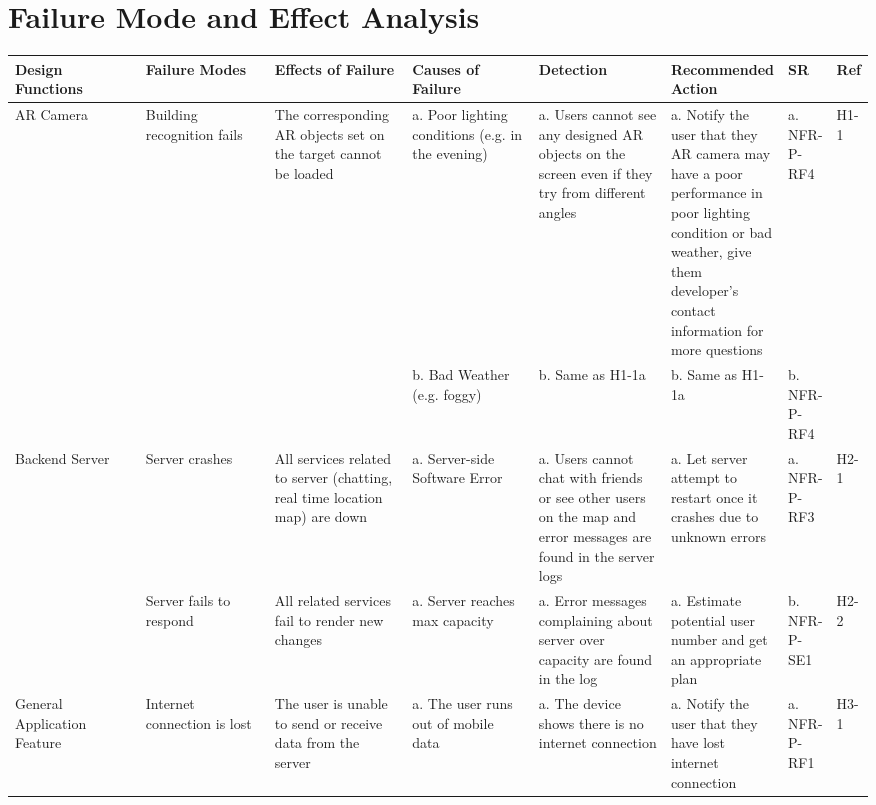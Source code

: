 \documentclass{article}
\begin{document}
\section{Failure Mode and Effect Analysis}
\begin{table}[H]
    \begin{adjustbox}{width=(/5)}
    \centering
    

    \begin{tabular}{|p{0.20\linewidth} | p{0.20\linewidth} | p{0.20\linewidth}|  p{0.20\linewidth}|  p{0.21\linewidth}|  p{0.30\linewidth}|  p{0.08\linewidth}|p{0.07\linewidth}| }
    \hline
         \textbf{Design Functions} & \textbf{Failure Modes} & \textbf{Effects of Failure} & \textbf{Causes of Failure} &\textbf{Detection}& \textbf{Recommended Action} & \textbf{SR} & \textbf{Ref}\\
         \hline
         AR Camera      &     Building recognition fails      &      The corresponding AR objects set on the target cannot be loaded      &      a. Poor lighting conditions (e.g. in the evening)      &      a. Users cannot see any designed AR objects on the screen even if they try from different angles      &      a. Notify the user that they AR camera may have a poor performance in poor lighting condition or bad weather, give them developer's contact information for more questions      &      a. NFR-P-RF4      &      H1-1      \\
         &&&      b. Bad Weather (e.g. foggy)      &      b. Same as H1-1a      &      b. Same as H1-1a      &      b. NFR-P-RF4      &      \\
         \hline
         Backend Server     &    Server crashes      &      All services related to server (chatting, real time location map) are down      &      a. Server-side Software Error      &      a. Users cannot chat with friends or see other users on the map and error messages are found in the server logs      &      a. Let server attempt to restart once it crashes due to unknown errors      &      a. NFR-P-RF3      &      H2-1      \\
         &      Server fails to respond      &       All related services fail to render new changes      &      a. Server reaches max capacity      &      a. Error messages complaining about server over capacity are found in the log      &      a. Estimate potential user number and get an appropriate plan      &      b. NFR-P-SE1      &      H2-2      \\
         \hline
        General Application Feature      &      Internet connection is lost      &       The user is unable to send or receive data from the server     &      a. The user runs out of mobile data      &      a. The device shows there is no internet connection       &      a. Notify the user that they have lost internet connection      &      a. NFR-P-RF1      &      H3-1      \\

\end{tabular}
\end{adjustbox}
\end{table}
\end{document}
